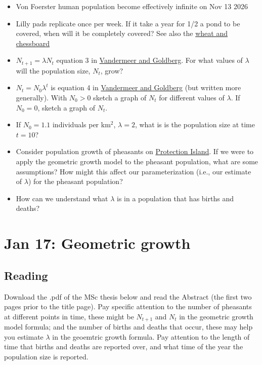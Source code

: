 \documentclass[
]{book}
\begin{document}
\begin{itemize}
\item
  Von Foerster human population become effectively infinite on Nov 13 2026
\item
  Lilly pads replicate once per week. If it take a year for 1/2 a pond to be covered, when will it be completely covered? See also the \href{https://en.wikipedia.org/wiki/Wheat_and_chessboard_problem}{wheat and chessboard}
\item
  \(N_{t+1} = \lambda N_t\) equation 3 in \href{https://ebookcentral-proquest-com.qe2a-proxy.mun.ca/lib/mun/detail.action?docID=1205619}{Vandermeer and Goldberg}. For what values of \(\lambda\) will the population size, \(N_t\), grow?
\item
  \(N_t = N_0 \lambda^t\) is equation 4 in \href{https://ebookcentral-proquest-com.qe2a-proxy.mun.ca/lib/mun/detail.action?docID=1205619}{Vandermeer and Goldberg} (but written more generally). With \(N_0 > 0\) sketch a graph of \(N_t\) for different values of \(\lambda\). If \(N_0 = 0\), sketch a graph of \(N_t\).
\item
  If \(N_0 = 1.1\) individuals per km\(^2\), \(\lambda = 2\), what is is the population size at time \(t = 10\)?
\item
  Consider population growth of pheasants on \protect\hyperlink{pheasant}{Protection Island}. If we were to apply the geometric growth model to the pheasant population, what are some assumptions? How might this affect our parameterization (i.e., our estimate of \(\lambda\)) for the pheasant population?
\item
  How can we understand what \(\lambda\) is in a population that has births and deaths?
\end{itemize}

\hypertarget{pheasant}{%
\chapter{Jan 17: Geometric growth}\label{pheasant}}

\hypertarget{reading-1}{%
\section{Reading}\label{reading-1}}

Download the .pdf of the MSc thesis below and read the Abstract (the first two pages prior to the title page). Pay specific attention to the number of pheasants at different points in time, these might be \(N_{t+1}\) and \(N_t\) in the geometric growth model formula; and the number of births and deaths that occur, these may help you estimate \(\lambda\) in the geoemtric growth formula. Pay attention to the length of time that births and deaths are reported over, and what time of the year the population size is reported.
\end{document}
